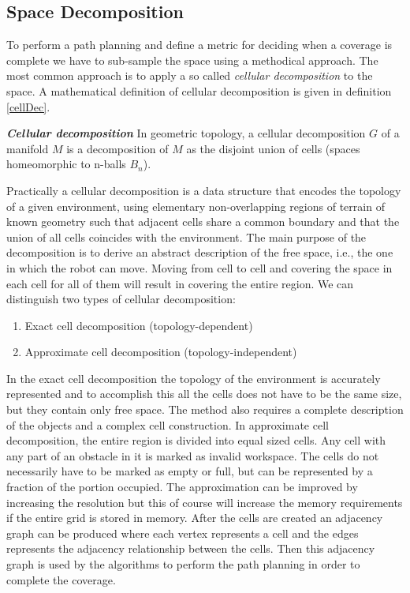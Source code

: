 \subsection{Space Decomposition}
\label{sec:spaceDec}

To perform a path planning and define a metric for deciding when a coverage is complete we have to sub-sample the space using a methodical approach. The most common approach is to apply a so called \emph{cellular decomposition} to the space. A mathematical definition of cellular decomposition is given in definition \ref{cellDec}.

\theoremstyle{definition}
\begin{definition}{\textbf{\textit{Cellular decomposition}}}\label{cellDec}
In geometric topology, a cellular decomposition $G$ of a manifold $M$ is a decomposition of $M$ as the disjoint union of cells (spaces homeomorphic to n-balls $B_n$).
\end{definition}

Practically a cellular decomposition is a data structure that encodes the topology of a given environment, using elementary non-overlapping regions of terrain of known geometry such that adjacent cells share a common boundary and that the union of all cells coincides with the environment. The main purpose of the decomposition is to derive an abstract description of the free space, i.e., the one in which the robot can move. Moving from cell to cell and covering the space in each cell for all of them will result in covering the entire region.
\clearpage
\noindent We can distinguish two types of cellular decomposition:
\begin{enumerate}
\item Exact cell decomposition (topology-dependent)
\item Approximate cell decomposition (topology-independent)
\end{enumerate}


In the exact cell decomposition the topology of the environment is accurately represented and to accomplish this all the cells does not have to be the same size, but they contain only free space. The method also requires a complete description of the objects and a complex cell construction.  In approximate cell decomposition, the entire region is divided into equal sized cells. Any cell with any part of an obstacle in it is marked as invalid workspace. The cells do not necessarily have to be marked as empty or full, but can be represented by a fraction of the portion occupied. The approximation can be improved by increasing the resolution but this of course will increase the memory requirements if the entire grid is stored in memory. After the cells are created an adjacency graph can be produced where each vertex represents a cell and the edges represents the adjacency relationship between the cells. Then this adjacency graph is used by the algorithms to perform the path planning in order to complete the coverage.

